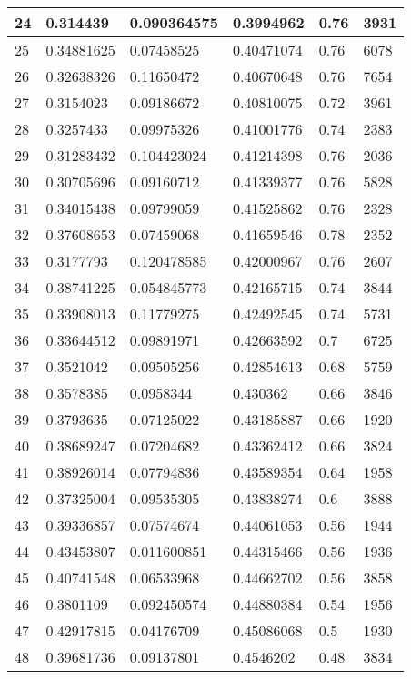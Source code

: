 \begin{longtable}{|l|l|l|l|l|l|}
24 & 0.314439 & 0.090364575 & 0.3994962 & 0.76 & 3931 \\ \hline 
25 & 0.34881625 & 0.07458525 & 0.40471074 & 0.76 & 6078 \\ \hline 
26 & 0.32638326 & 0.11650472 & 0.40670648 & 0.76 & 7654 \\ \hline 
27 & 0.3154023 & 0.09186672 & 0.40810075 & 0.72 & 3961 \\ \hline 
28 & 0.3257433 & 0.09975326 & 0.41001776 & 0.74 & 2383 \\ \hline 
29 & 0.31283432 & 0.104423024 & 0.41214398 & 0.76 & 2036 \\ \hline 
30 & 0.30705696 & 0.09160712 & 0.41339377 & 0.76 & 5828 \\ \hline 
31 & 0.34015438 & 0.09799059 & 0.41525862 & 0.76 & 2328 \\ \hline 
32 & 0.37608653 & 0.07459068 & 0.41659546 & 0.78 & 2352 \\ \hline 
33 & 0.3177793 & 0.120478585 & 0.42000967 & 0.76 & 2607 \\ \hline 
34 & 0.38741225 & 0.054845773 & 0.42165715 & 0.74 & 3844 \\ \hline 
35 & 0.33908013 & 0.11779275 & 0.42492545 & 0.74 & 5731 \\ \hline 
36 & 0.33644512 & 0.09891971 & 0.42663592 & 0.7 & 6725 \\ \hline 
37 & 0.3521042 & 0.09505256 & 0.42854613 & 0.68 & 5759 \\ \hline 
38 & 0.3578385 & 0.0958344 & 0.430362 & 0.66 & 3846 \\ \hline 
39 & 0.3793635 & 0.07125022 & 0.43185887 & 0.66 & 1920 \\ \hline 
40 & 0.38689247 & 0.07204682 & 0.43362412 & 0.66 & 3824 \\ \hline 
41 & 0.38926014 & 0.07794836 & 0.43589354 & 0.64 & 1958 \\ \hline 
42 & 0.37325004 & 0.09535305 & 0.43838274 & 0.6 & 3888 \\ \hline 
43 & 0.39336857 & 0.07574674 & 0.44061053 & 0.56 & 1944 \\ \hline 
44 & 0.43453807 & 0.011600851 & 0.44315466 & 0.56 & 1936 \\ \hline 
45 & 0.40741548 & 0.06533968 & 0.44662702 & 0.56 & 3858 \\ \hline 
46 & 0.3801109 & 0.092450574 & 0.44880384 & 0.54 & 1956 \\ \hline 
47 & 0.42917815 & 0.04176709 & 0.45086068 & 0.5 & 1930 \\ \hline 
48 & 0.39681736 & 0.09137801 & 0.4546202 & 0.48 & 3834 \\ \hline 

\end{longtable}
